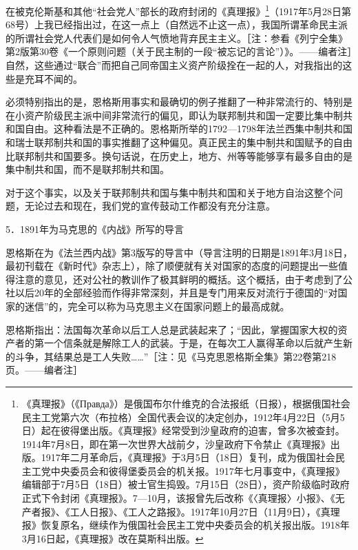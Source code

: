 \documentclass[UTF8, 12pt, a4paper]{ctexrep}
\begin{document}
在被克伦斯基和其他“社会党人”部长的政府封闭的《真理报》\footnote{《真理报》（《Правда》）是俄国布尔什维克的合法报纸（日报），根据俄国社会民主工党第六次（布拉格）全国代表会议的决定创办，1912年4月22日（5月5日）起在彼得堡出版。《真理报》经常受到沙皇政府的迫害，曾多次被查封。1914年7月8日，即在第一次世界大战前夕，沙皇政府下令禁止《真理报》出版。1917年二月革命后，《真理报》于3月5日（18日）复刊，成为俄国社会民主工党中央委员会和彼得堡委员会的机关报。1917年七月事变中，《真理报》编辑部于7月5日（18日）被士官生捣毁。7月15日（28日），资产阶级临时政府正式下令封闭《真理报》。7—10月，该报曾先后改称《〈真理报〉小报》、《无产者报》、《工人日报》、《工人之路报》。1917年10月27日（11月9日），《真理报》恢复原名，继续作为俄国社会民主工党中央委员会的机关报出版。1918年3月16日起，《真理报》改在莫斯科出版。}（1917年5月28日第68号）上我已经指出过，在这一点上（自然远不止这一点），我国所谓革命民主派的所谓社会党人代表们是如何令人气愤地背弃民主主义。［注：参看《列宁全集》第2版第30卷《一个原则问题（关于民主制的一段“被忘记的言论”）》。——编者注］自然，这些通过“联合”而把自己同帝国主义资产阶级拴在一起的人，对我指出的这些是充耳不闻的。

必须特别指出的是，恩格斯用事实和最确切的例子推翻了一种非常流行的、特别是在小资产阶级民主派中间非常流行的偏见，即认为联邦制共和国一定要比集中制共和国自由。这种看法是不正确的。恩格斯所举的1792—1798年法兰西集中制共和国和瑞士联邦制共和国的事实推翻了这种偏见。真正民主的集中制共和国赋予的自由比联邦制共和国要多。换句话说，在历史上，地方、州等等能够享有最多自由的是集中制共和国，而不是联邦制共和国。

对于这个事实，以及关于联邦制共和国与集中制共和国和关于地方自治这整个问题，无论过去和现在，我们党的宣传鼓动工作都没有充分注意。

5．1891年为马克思的《内战》所写的导言

恩格斯在为《法兰西内战》第3版写的导言中（导言注明的日期是1891年3月18日，最初刊载在《新时代》杂志上），除了顺便就有关对国家的态度的问题提出一些值得注意的意见，还对公社的教训作了极其鲜明的概括。这个概括，由于考虑到了公社以后20年的全部经验而作得非常深刻，并且是专门用来反对流行于德国的“对国家的迷信”的，完全可以称为马克思主义在国家问题上的最高成就。

恩格斯指出：法国每次革命以后工人总是武装起来了；“因此，掌握国家大权的资产者的第一个信条就是解除工人的武装。于是，在每次工人赢得革命以后就产生新的斗争，其结果总是工人失败……”［注：见《马克思恩格斯全集》第22卷第218页。——编者注］
\end{document}
